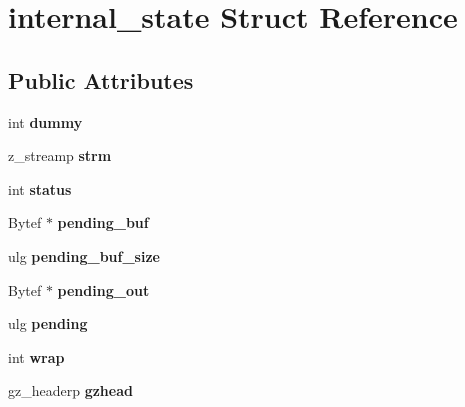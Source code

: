 \hypertarget{structinternal__state}{}\section{internal\+\_\+state Struct Reference}
\label{structinternal__state}
\subsection*{Public Attributes}
\begin{DoxyCompactItemize}
\item 
\mbox{\label{structinternal__state_ab000a3e3c901dd063859521988ad7e52}} 
int {\bfseries dummy}
\item 
\mbox{\label{structinternal__state_aaf558a49ab8c6caea3d131c6b913db42}} 
z\+\_\+streamp {\bfseries strm}
\item 
\mbox{\label{structinternal__state_a8756cacdbac452a2633f87e06fae6c52}} 
int {\bfseries status}
\item 
\mbox{\label{structinternal__state_a4998af1dd95f4ce89a420c75c3df887e}} 
Bytef $\ast$ {\bfseries pending\+\_\+buf}
\item 
\mbox{\label{structinternal__state_a9100ecccf2f8bb474f0bcc7c69f55c27}} 
ulg {\bfseries pending\+\_\+buf\+\_\+size}
\item 
\mbox{\label{structinternal__state_aa35c3b4c7163a9650a6a893156d6c522}} 
Bytef $\ast$ {\bfseries pending\+\_\+out}
\item 
\mbox{\label{structinternal__state_a49a08fe5a8e2ff1a73419fea828790e4}} 
ulg {\bfseries pending}
\item 
\mbox{\label{structinternal__state_ae80327ea7ad4ad0ef5baeef5ef3a6807}} 
int {\bfseries wrap}
\item 
\mbox{\label{structinternal__state_ac023d0c9e6112dfe6cbd049a56484997}} 
gz\+\_\+headerp {\bfseries gzhead}
\item 

\end{DoxyCompactItemize}
